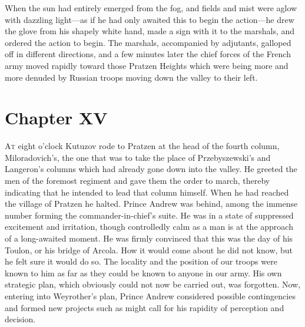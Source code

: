 When the sun had entirely emerged from the fog, and fields and
mist were aglow with dazzling light---as if he had only awaited
this to begin the action---he drew the glove from his shapely
white hand, made a sign with it to the marshals, and ordered the
action to begin. The marshals, accompanied by adjutants, galloped
off in different directions, and a few minutes later the chief
forces of the French army moved rapidly toward those Pratzen
Heights which were being more and more denuded by Russian troops
moving down the valley to their left.


\chapter*{Chapter XV}
\ifaudio
{} 
\fi

\lettrine[lines=2, loversize=0.3, lraise=0]{\initfamily A}{t}
eight o'clock Kutuzov rode to Pratzen at the head of the
fourth column, Miloradovich's, the one that was to take the place
of Przebyszewski's and Langeron's columns which had already gone
down into the valley. He greeted the men of the foremost regiment
and gave them the order to march, thereby indicating that he
intended to lead that column himself. When he had reached the
village of Pratzen he halted.  Prince Andrew was behind, among
the immense number forming the commander-in-chief's suite. He was
in a state of suppressed excitement and irritation, though
controlledly calm as a man is at the approach of a long-awaited
moment. He was firmly convinced that this was the day of his
Toulon, or his bridge of Arcola. How it would come about he did
not know, but he felt sure it would do so. The locality and the
position of our troops were known to him as far as they could be
known to anyone in our army. His own strategic plan, which
obviously could not now be carried out, was forgotten. Now,
entering into Weyrother's plan, Prince Andrew considered possible
contingencies and formed new projects such as might call for his
rapidity of perception and decision.

